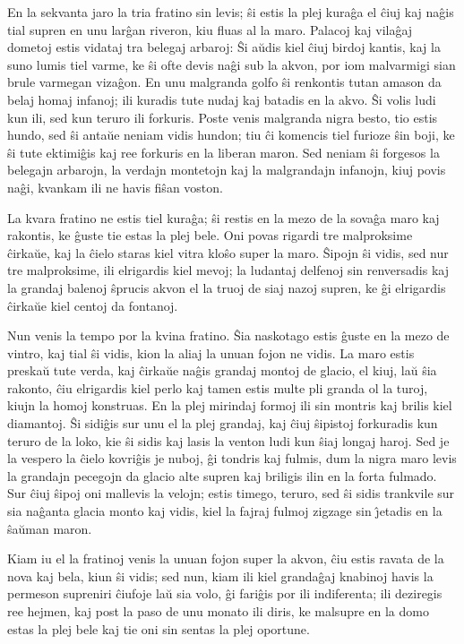    En la sekvanta jaro la tria fratino sin levis; \^si estis la plej
kura\^ga el \^ciuj kaj na\^gis tial supren en unu lar\^gan riveron,
kiu fluas al la maro. Palacoj kaj vila\^gaj dometoj estis vidataj
tra belegaj arbaroj: \^Si a\u udis kiel \^ciuj birdoj kantis, kaj la
suno lumis tiel varme, ke \^si ofte devis na\^gi sub la akvon, por
iom malvarmigi sian brule varmegan viza\^gon. En unu malgranda golfo
\^si renkontis tutan amason da belaj homaj infanoj; ili kuradis tute
nudaj kaj batadis en la akvo. \^Si volis ludi kun ili, sed kun
teruro ili forkuris. Poste venis malgranda nigra besto, tio estis
hundo, sed \^si anta\u ue neniam vidis hundon; tiu \^ci komencis
tiel furioze \^sin boji, ke \^si tute ektimi\^gis kaj ree forkuris
en la liberan maron. Sed neniam \^si forgesos la belegajn arbarojn,
la verdajn montetojn kaj la malgrandajn infanojn, kiuj povis na\^gi,
kvankam ili ne havis fi\^san voston.

   La kvara fratino ne estis tiel kura\^ga; \^si restis en la mezo de la
sova\^ga maro kaj rakontis, ke \^guste tie estas la plej bele. Oni
povas rigardi tre malproksime \^cirka\u ue, kaj la \^cielo staras
kiel vitra klo\^so super la maro. \^Sipojn \^si vidis, sed nur tre
malproksime, ili elrigardis kiel mevoj; la ludantaj delfenoj sin
renversadis kaj la grandaj balenoj \^sprucis akvon el la truoj de
siaj nazoj supren, ke \^gi elrigardis \^cirka\u ue kiel centoj da
fontanoj.

   Nun venis la tempo por la kvina fratino. \^Sia naskotago estis \^guste
en la mezo de vintro, kaj tial \^si vidis, kion la aliaj la unuan
fojon ne vidis. La maro estis preska\u u tute verda, kaj \^cirka\u
ue na\^gis grandaj montoj de glacio, el kiuj, la\u u \^sia rakonto,
\^ciu elrigardis kiel perlo kaj tamen estis multe pli granda ol la
turoj, kiujn la homoj konstruas. En la plej mirindaj formoj ili sin
montris kaj brilis kiel diamantoj. \^Si sidi\^gis sur unu el la plej
grandaj, kaj \^ciuj \^sipistoj forkuradis kun teruro de la loko, kie
\^si sidis kaj lasis la venton ludi kun \^siaj longaj haroj. Sed je
la vespero la \^cielo kovri\^gis je nuboj, \^gi tondris kaj fulmis,
dum la nigra maro levis la grandajn pecegojn da glacio alte supren
kaj briligis ilin en la forta fulmado. Sur \^ciuj \^sipoj oni
mallevis la velojn; estis timego, teruro, sed \^si sidis trankvile
sur sia na\^ganta glacia monto kaj vidis, kiel la fajraj fulmoj
zigzage sin \^{\j}etadis en la \^sa\u uman maron.

   Kiam iu el la fratinoj venis la unuan fojon super la akvon, \^ciu
estis ravata de la nova kaj bela, kiun \^si vidis; sed nun, kiam ili
kiel granda\^gaj knabinoj havis la permeson supreniri \^ciufoje la\u
u sia volo, \^gi fari\^gis por ili indiferenta; ili deziregis ree
hejmen, kaj post la paso de unu monato ili diris, ke malsupre en la
domo estas la plej bele kaj tie oni sin sentas la plej oportune.

